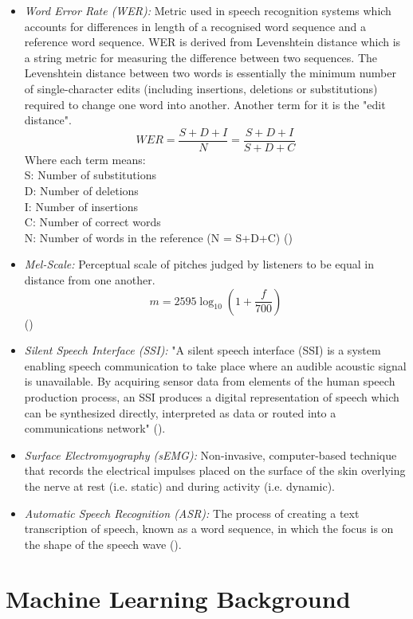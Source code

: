 \begin{itemize}
  \item \emph{Word Error Rate (WER):}
  Metric used in speech recognition systems which accounts for differences in length of
  a recognised word sequence and a reference word sequence. WER is derived from
  Levenshtein distance  which is a string metric for measuring the difference between two
  sequences. The Levenshtein distance between two words is essentially the minimum number of
  single-character edits (including insertions, deletions or substitutions) required to
  change one word into another. Another term for it is the "edit distance".
  \[
    WER
    = \dfrac{S + D + I}{N}
    = \dfrac{S + D + I}{S + D + C}
  \]
  Where each term means:\\
  S: Number of substitutions\\
  D: Number of deletions\\
  I: Number of insertions\\
  C: Number of correct words\\
  N: Number of words in the reference (N = S+D+C)
  (\cite{1966SPhD...10..707L})
  \item \emph{Mel-Scale:}
  Perceptual scale of pitches judged by listeners to be equal in distance from one another.
  \[ m = 2595 \log_{10} \left(1 + \dfrac{f}{700}\right) \]
  (\cite{mel_scale_formula})
  \item \emph{Silent Speech Interface (SSI):}
  "A silent speech interface (SSI) is a system enabling speech communication to take
  place where an audible acoustic signal is unavailable. By acquiring sensor data from
  elements of the human speech production process, an SSI produces a digital representation
  of speech which can be synthesized directly, interpreted as data or routed into a communications
  network" (\cite{ssi_definition}).
  \item \emph{Surface Electromyography (sEMG):}
  Non-invasive, computer-based technique that records the electrical impulses placed on the surface
  of the skin overlying the nerve at rest (i.e. static) and during activity (i.e. dynamic).
  \item \emph{Automatic Speech Recognition (ASR):}
  The process of creating a text transcription of speech, known as a word sequence,
  in which the focus is on the shape of the speech wave (\cite{asr_definition}).
\end{itemize}

\section{Machine Learning Background}

